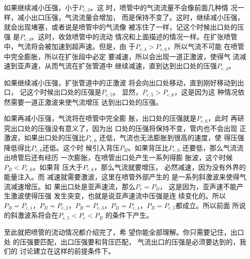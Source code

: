 \begin{notice}
\hspace{2em}
如果继续减小压强，小于$P_{e,3} $。这
时，喷管中的气流流量不会像前面几种情
况一样，减小出口压强，气流流量会增加，
而是保持不变了。这时，继续减小压强，
就会出现堵塞，或者说是喷管中的气流像
被冻住了一样，记这个时候出口处的压强
是$P_{e,4} $。这时，收敛喷管中的流动
情况和上面描述的情况一样。在扩张喷管
中，气流将会被加速到超声速。但是，由
于$P_{e,4}>P_{e,6} $，所以气流不可能
在喷管中完全膨胀，所以在扩张段中必定
要减速，所以会出现一道正激波，使得气
流减速到亚声速，从而气流在扩张管道中
继续减速，直到达到出口处的压强$P_{e,
4}$。

\hspace{2em}
如果继续减小压强，扩张管道中的正激波
将会向出口处移动，直到刚好移动到出口，
记这个时候出口处的压强是$P_{e,5} $。
显然，$P_{e,5}>P_{e,6} $，这是因为这
种情况依然需要一道正激波来使气流增压
达到出口处的压强。

\hspace{2em}
如果再减小压强，气流将在喷管中完全膨
胀，出口处的压强就是$P_{e,6} $，此时
再研究出口处的压强没有意义了，因为出
口处的压强将保持不变，管内也不会出现
正激波，如果出口处的压强比$P_{e,6} $
还低，气流也无法膨胀到很高的速度，使
得压强降低得比$P_{e,6} $还低。这个时
候引入背压$P_B$。如果背压比$P_{e,6} 
$ 还要低，那么气流流出喷管后还有经历
一次膨胀，在喷管出口处产生一系列得膨
胀波，这个时候$P_B<P_{e,6} $。如果背
压大于$P_{e,6} $，那么气流就要增压，
必然减速，因为没有外界的能量注入。而
减速就需要激波，这里在喷管外部产生的
是一系列斜激波来使得气流减速增压。如
果出口处是亚声速流，那么$P_e=P_B $，
这是因为，亚声速不能产生激波使得压强
发生突变，也就是说亚声速流中压强是连
续变化的。所以$P_B=P_{e,1} $，$P_B=P
_{e,2} $，$P_B=P_{e,3} $，$P_B=P_{e,
4} $，$P_B=P_{e,5} $都成立。所以前面
所说的斜激波系将会在$P_{e,5}<P_e<P_B$
的条件下产生。

\hspace{2em}
至此就把喷管的流动情况都介绍完了，希
望你能全部理解。你只需要记住，出口处
的压强要匹配，出口压强要和背压匹配，
气流出口的压强是必须要达到的，我们的
讨论建立在这样的前提条件下。
\end{notice}





